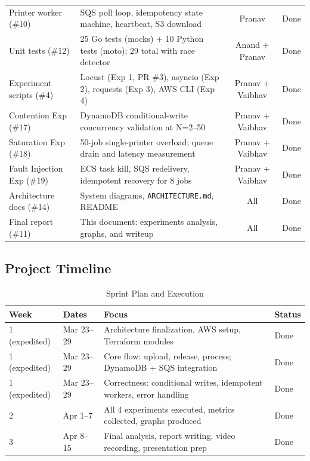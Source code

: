\documentclass[11pt,letterpaper]{article}
\newcommand{\code}[1]{\texttt{\small #1}}
\begin{document}
\begin{table}[H]
\begin{tabularx}{\linewidth}{@{}lXcc@{}}
Printer worker (\#10)    & SQS poll loop, idempotency state machine, heartbeat, S3 download & Pranav & \textcolor{success}{Done} \\
Unit tests (\#12)        & 25 Go tests (mocks) + 10 Python tests (moto); 29 total with race detector & Anand + Pranav & \textcolor{success}{Done} \\
Experiment scripts (\#4) & Locust (Exp 1, PR \#3), asyncio (Exp 2), requests (Exp 3), AWS CLI (Exp 4) & Pranav + Vaibhav & \textcolor{success}{Done} \\
Contention Exp (\#17)    & DynamoDB conditional-write concurrency validation at N=2--50 & Pranav + Vaibhav & \textcolor{success}{Done} \\
Saturation Exp (\#18)    & 50-job single-printer overload; queue drain and latency measurement & Pranav + Vaibhav & \textcolor{success}{Done} \\
Fault Injection Exp (\#19) & ECS task kill, SQS redelivery, idempotent recovery for 8 jobs & Pranav + Vaibhav & \textcolor{success}{Done} \\
Architecture docs (\#14) & System diagrams, \code{ARCHITECTURE.md}, README & All & \textcolor{success}{Done} \\
Final report (\#11)      & This document: experiments analysis, graphs, and writeup & All & \textcolor{success}{Done} \\
\bottomrule
\end{tabularx}
\end{table}

\subsection{Project Timeline}

\begin{table}[H]
\centering
\caption{Sprint Plan and Execution}
\begin{tabularx}{\linewidth}{@{}llXl@{}}
\toprule
\textbf{Week} & \textbf{Dates} & \textbf{Focus} & \textbf{Status} \\
\midrule
1 (expedited) & Mar 23--29 & Architecture finalization, AWS setup, Terraform modules & \textcolor{success}{Done} \\
1 (expedited) & Mar 23--29 & Core flow: upload, release, process; DynamoDB + SQS integration & \textcolor{success}{Done} \\
1 (expedited) & Mar 23--29 & Correctness: conditional writes, idempotent workers, error handling & \textcolor{success}{Done} \\
2             & Apr 1--7   & All 4 experiments executed, metrics collected, graphs produced & \textcolor{success}{Done} \\
3             & Apr 8--15  & Final analysis, report writing, video recording, presentation prep & \textcolor{success}{Done} \\
\bottomrule
\end{tabularx}
\end{table}
\end{document}
